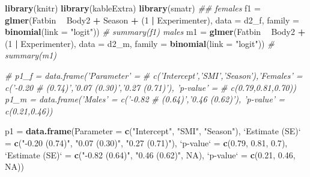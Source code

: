 \documentclass[
]{article}
\newenvironment{Shaded}{\begin{snugshade}}{\end{snugshade}}
\newcommand{\CommentTok}[1]{\textcolor[rgb]{0.56,0.35,0.01}{\textit{#1}}}
\newcommand{\DataTypeTok}[1]{\textcolor[rgb]{0.13,0.29,0.53}{#1}}
\newcommand{\DecValTok}[1]{\textcolor[rgb]{0.00,0.00,0.81}{#1}}
\newcommand{\FloatTok}[1]{\textcolor[rgb]{0.00,0.00,0.81}{#1}}
\newcommand{\KeywordTok}[1]{\textcolor[rgb]{0.13,0.29,0.53}{\textbf{#1}}}
\newcommand{\NormalTok}[1]{#1}
\newcommand{\OperatorTok}[1]{\textcolor[rgb]{0.81,0.36,0.00}{\textbf{#1}}}
\newcommand{\OtherTok}[1]{\textcolor[rgb]{0.56,0.35,0.01}{#1}}
\newcommand{\StringTok}[1]{\textcolor[rgb]{0.31,0.60,0.02}{#1}}
\begin{document}
\begin{Shaded}
\begin{Highlighting}[]
\KeywordTok{library}\NormalTok{(knitr)}
\KeywordTok{library}\NormalTok{(kableExtra)}
\KeywordTok{library}\NormalTok{(smatr)}
\CommentTok{## females}
\NormalTok{f1 =}\StringTok{ }\KeywordTok{glmer}\NormalTok{(Fatbin }\OperatorTok{~}\StringTok{ }\NormalTok{Body2 }\OperatorTok{+}\StringTok{ }\NormalTok{Season }\OperatorTok{+}\StringTok{ }\NormalTok{(}\DecValTok{1} \OperatorTok{|}\StringTok{ }\NormalTok{Experimenter), }\DataTypeTok{data =}\NormalTok{ d2_f, }
    \DataTypeTok{family =} \KeywordTok{binomial}\NormalTok{(}\DataTypeTok{link =} \StringTok{"logit"}\NormalTok{))}
\CommentTok{# summary(f1) males}
\NormalTok{m1 =}\StringTok{ }\KeywordTok{glmer}\NormalTok{(Fatbin }\OperatorTok{~}\StringTok{ }\NormalTok{Body2 }\OperatorTok{+}\StringTok{ }\NormalTok{(}\DecValTok{1} \OperatorTok{|}\StringTok{ }\NormalTok{Experimenter), }\DataTypeTok{data =}\NormalTok{ d2_m, }
    \DataTypeTok{family =} \KeywordTok{binomial}\NormalTok{(}\DataTypeTok{link =} \StringTok{"logit"}\NormalTok{))}
\CommentTok{# summary(m1)}

\CommentTok{# p1_f = data.frame('Parameter' =}
\CommentTok{# c('Intercept','SMI','Season'),'Females' = c('-0.20}
\CommentTok{# (0.74)','0.07 (0.30)','0.27 (0.71)'), 'p-value' =}
\CommentTok{# c(0.79,0.81,0.70)) p1_m = data.frame('Males' = c('-0.82}
\CommentTok{# (0.64)','0.46 (0.62)'), 'p-value' = c(0.21,0.46))}

\NormalTok{p1 =}\StringTok{ }\KeywordTok{data.frame}\NormalTok{(}\DataTypeTok{Parameter =} \KeywordTok{c}\NormalTok{(}\StringTok{"Intercept"}\NormalTok{, }\StringTok{"SMI"}\NormalTok{, }\StringTok{"Season"}\NormalTok{), }
    \StringTok{`}\DataTypeTok{Estimate (SE)}\StringTok{`}\NormalTok{ =}\StringTok{ }\KeywordTok{c}\NormalTok{(}\StringTok{"-0.20 (0.74)"}\NormalTok{, }\StringTok{"0.07 (0.30)"}\NormalTok{, }\StringTok{"0.27 (0.71)"}\NormalTok{), }
    \StringTok{`}\DataTypeTok{p-value}\StringTok{`}\NormalTok{ =}\StringTok{ }\KeywordTok{c}\NormalTok{(}\FloatTok{0.79}\NormalTok{, }\FloatTok{0.81}\NormalTok{, }\FloatTok{0.7}\NormalTok{), }\StringTok{`}\DataTypeTok{Estimate (SE)}\StringTok{`}\NormalTok{ =}\StringTok{ }\KeywordTok{c}\NormalTok{(}\StringTok{"-0.82 (0.64)"}\NormalTok{, }
        \StringTok{"0.46 (0.62)"}\NormalTok{, }\OtherTok{NA}\NormalTok{), }\StringTok{`}\DataTypeTok{p-value}\StringTok{`}\NormalTok{ =}\StringTok{ }\KeywordTok{c}\NormalTok{(}\FloatTok{0.21}\NormalTok{, }\FloatTok{0.46}\NormalTok{, }\OtherTok{NA}\NormalTok{))}


\end{Highlighting}
\end{Shaded}
\end{document}
